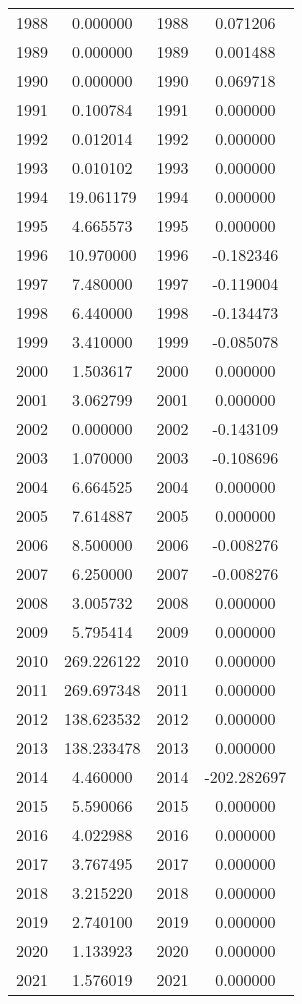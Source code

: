 \documentclass[12pt]{article}
\begin{document}
\begin{longtable}{@{}cccc@{}}
1988 & 0.000000 & 1988 & 0.071206 \\
1989 & 0.000000 & 1989 & 0.001488 \\
1990 & 0.000000 & 1990 & 0.069718 \\
1991 & 0.100784 & 1991 & 0.000000 \\
1992 & 0.012014 & 1992 & 0.000000 \\
1993 & 0.010102 & 1993 & 0.000000 \\
1994 & 19.061179 & 1994 & 0.000000 \\
1995 & 4.665573 & 1995 & 0.000000 \\
1996 & 10.970000 & 1996 & -0.182346 \\
1997 & 7.480000 & 1997 & -0.119004 \\
1998 & 6.440000 & 1998 & -0.134473 \\
1999 & 3.410000 & 1999 & -0.085078 \\
2000 & 1.503617 & 2000 & 0.000000 \\
2001 & 3.062799 & 2001 & 0.000000 \\
2002 & 0.000000 & 2002 & -0.143109 \\
2003 & 1.070000 & 2003 & -0.108696 \\
2004 & 6.664525 & 2004 & 0.000000 \\
2005 & 7.614887 & 2005 & 0.000000 \\
2006 & 8.500000 & 2006 & -0.008276 \\
2007 & 6.250000 & 2007 & -0.008276 \\
2008 & 3.005732 & 2008 & 0.000000 \\
2009 & 5.795414 & 2009 & 0.000000 \\
2010 & 269.226122 & 2010 & 0.000000 \\
2011 & 269.697348 & 2011 & 0.000000 \\
2012 & 138.623532 & 2012 & 0.000000 \\
2013 & 138.233478 & 2013 & 0.000000 \\
2014 & 4.460000 & 2014 & -202.282697 \\
2015 & 5.590066 & 2015 & 0.000000 \\
2016 & 4.022988 & 2016 & 0.000000 \\
2017 & 3.767495 & 2017 & 0.000000 \\
2018 & 3.215220 & 2018 & 0.000000 \\
2019 & 2.740100 & 2019 & 0.000000 \\
2020 & 1.133923 & 2020 & 0.000000 \\
2021 & 1.576019 & 2021 & 0.000000 \\

\end{longtable}
\end{document}
